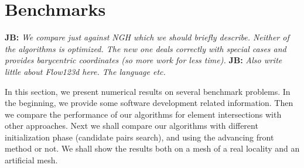 \documentclass{elsarticle}
\newcommand{\noteJB}[1]{{\color{Blue} \textbf{JB: } \textit{#1}}}
\begin{document}
% 





\section{Benchmarks}
\label{sec:benchmarks}

\noteJB{We compare just against NGH which we should briefly describe. Neither of the algorithms is optimized. The new one deals correctly with special cases and provides 
barycentric coordinates (so more work for less time).}
\noteJB{Also write little about Flow123d here. The language etc.}

In this section, we present numerical results on several benchmark problems. 
In the beginning, we provide some software development related information.
Then we compare the performance of our algorithms for element intersections with other approaches.
Next we shall compare our algorithms with different initialization phase (candidate pairs search),
and using the advancing front method or not. We shall show the results both on a mesh of a real locality
and an artificial mesh.
\end{document}
